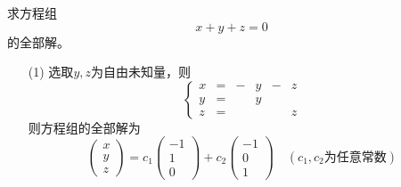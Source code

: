 \begin{frame}[allowframebreaks]
\begin{li}
  求方程组
  $$
  x+y+z=0
  $$
  的全部解。
\end{li}

\begin{jie}
\begin{itemize}
\item[(1)] 选取$y,z$为自由未知量，则
  $$
  \left\{
    \begin{array}{cccccc}
      x&=&-&y&-&z\\
      y&=&&y&&\\
      z&=&&&&z
    \end{array}
  \right.
  $$
  则方程组的全部解为
  $$
  \left(
    \begin{array}{r}
      x\\y\\z
    \end{array}
  \right) = c_1      \left(
    \begin{array}{r}
      -1\\1\\0
    \end{array}
  \right) + c_2      \left(
    \begin{array}{r}
      -1\\0\\1
    \end{array}
  \right) \quad (c_1,c_2\mbox{为任意常数})
  $$
\end{itemize}
\end{jie}
\end{frame}

